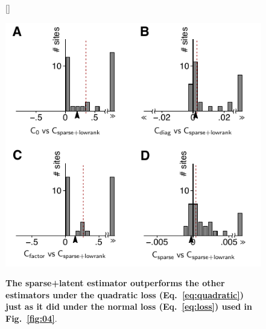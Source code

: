 \documentclass[10pt]{article}
\begin{document}
\begin{figure}[!ht]
[\FBwidth]
{\caption{{\bf The sparse+latent estimator outperforms the other estimators under the quadratic loss (Eq.~\ref{eq:quadratic}) just as it did under the normal loss (Eq.~\ref{eq:loss}) used in Fig.~\ref{fig:04}}.
}
\label{supp:02}}
{\includegraphics{./figures/Figure-Supp02.pdf}}
\end{figure}
\end{document}
